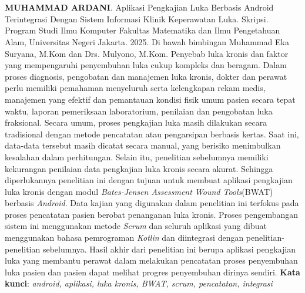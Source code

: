 \chapter*{}

\begin{spacing}{1}
\textbf{MUHAMMAD ARDANI}. Aplikasi Pengkajian Luka Berbasis Android Terintegrasi Dengan Sistem Informasi Klinik Keperawatan Luka. Skripsi. Program Studi Ilmu Komputer Fakultas Matematika dan Ilmu Pengetahuan Alam, Universitas Negeri Jakarta. 2025. Di bawah bimbingan Muhammad Eka Suryana, M.Kom dan Drs. Mulyono, M.Kom.
\newline
\newline
Penyebab luka kronis dan faktor yang mempengaruhi penyembuhan luka cukup kompleks dan beragam. Dalam proses diagnosis, pengobatan dan manajemen luka kronis, dokter dan perawat perlu memiliki pemahaman menyeluruh serta kelengkapan rekam medis, manajemen yang efektif dan pemantauan kondisi fisik umum pasien secara tepat waktu, laporan pemeriksaan laboratorium, penilaian dan pengobatan luka fraksional. Secara umum, proses pengkajian luka masih dilakukan secara tradisional dengan metode pencatatan atau pengarsipan berbasis kertas. Saat ini, data-data tersebut masih dicatat secara manual, yang berisiko menimbulkan kesalahan dalam perhitungan. Selain itu, penelitian sebelumnya memiliki kekurangan penilaian data pengkajian luka kronis secara akurat. Sehingga diperlukannya penelitian ini dengan tujuan untuk membuat aplikasi pengkajian luka kronis dengan modul \textit{Bates-Jensen Assessment Wound Tools}(BWAT) berbasis \textit{Android}. Data kajian yang digunakan dalam penelitian ini terfokus pada proses pencatatan pasien berobat penanganan luka kronis. Proses pengembangan sistem ini menggunakan metode \textit{Scrum} dan seluruh aplikasi yang dibuat menggunakan bahasa pemrograman \textit{Kotlin} dan diintegrasi dengan penelitian-penelitian sebelumnya. Hasil akhir dari penelitian ini berupa aplikasi pengkajian luka yang membantu perawat dalam melakukan pencatatan proses penyembuhan luka pasien dan pasien dapat melihat progres penyembuhan dirinya sendiri.
\newline
\newline
\noindent \textbf{Kata kunci}: \textit{android, aplikasi, luka kronis, BWAT, scrum, pencatatan, integrasi}
\end{spacing}